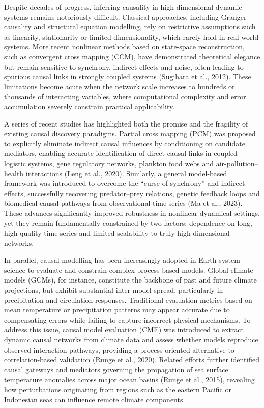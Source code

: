 \documentclass{article}
\begin{document}
Despite decades of progress, inferring causality in high-dimensional dynamic systems remains notoriously difficult. Classical approaches, including Granger causality and structural equation modelling, rely on restrictive assumptions such as linearity, stationarity or limited dimensionality, which rarely hold in real-world systems. More recent nonlinear methods based on state-space reconstruction, such as convergent cross mapping (CCM), have demonstrated theoretical elegance but remain sensitive to synchrony, indirect effects and noise, often leading to spurious causal links in strongly coupled systems (Sugihara et al., 2012). These limitations become acute when the network scale increases to hundreds or thousands of interacting variables, where computational complexity and error accumulation severely constrain practical applicability.

A series of recent studies has highlighted both the promise and the fragility of existing causal discovery paradigms. Partial cross mapping (PCM) was proposed to explicitly eliminate indirect causal influences by conditioning on candidate mediators, enabling accurate identification of direct causal links in coupled logistic systems, gene regulatory networks, plankton food webs and air-pollution–health interactions (Leng et al., 2020). Similarly, a general model-based framework was introduced to overcome the “curse of synchrony” and indirect effects, successfully recovering predator–prey relations, genetic feedback loops and biomedical causal pathways from observational time series (Ma et al., 2023). These advances significantly improved robustness in nonlinear dynamical settings, yet they remain fundamentally constrained by two factors: dependence on long, high-quality time series and limited scalability to truly high-dimensional networks.

In parallel, causal modelling has been increasingly adopted in Earth system science to evaluate and constrain complex process-based models. Global climate models (GCMs), for instance, constitute the backbone of past and future climate projections, but exhibit substantial inter-model spread, particularly in precipitation and circulation responses. Traditional evaluation metrics based on mean temperature or precipitation patterns may appear accurate due to compensating errors while failing to capture incorrect physical mechanisms. To address this issue, causal model evaluation (CME) was introduced to extract dynamic causal networks from climate data and assess whether models reproduce observed interaction pathways, providing a process-oriented alternative to correlation-based validation (Runge et al., 2020). Related efforts further identified causal gateways and mediators governing the propagation of sea surface temperature anomalies across major ocean basins (Runge et al., 2015), revealing how perturbations originating from regions such as the eastern Pacific or Indonesian seas can influence remote climate components.
\end{document}
